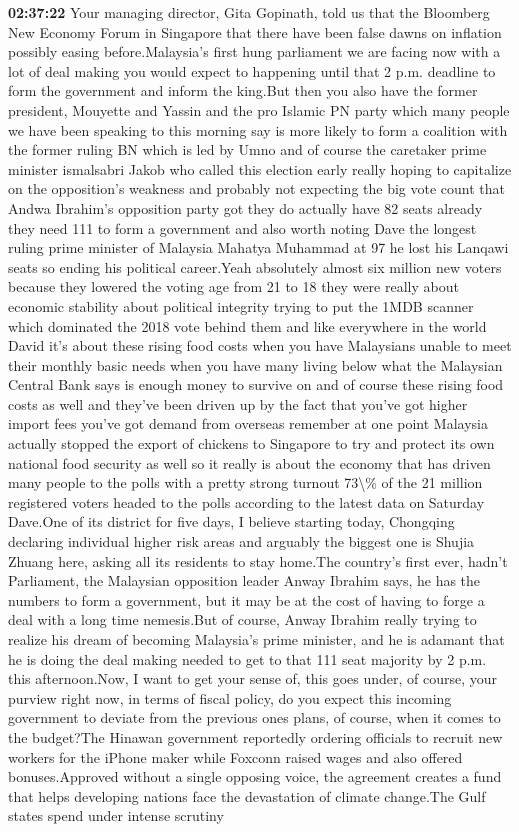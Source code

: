 \documentclass{article}%
\begin{document}
\textbf{02:37:22}%
\newline%
Your managing director, Gita Gopinath, told us that the Bloomberg New Economy Forum in Singapore that there have been false dawns on inflation possibly easing before.Malaysia's first hung parliament we are facing now with a lot of deal making you would expect to happening until that 2 p.m. deadline to form the government and inform the king.But then you also have the former president, Mouyette and Yassin and the pro Islamic PN party which many people we have been speaking to this morning say is more likely to form a coalition with the former ruling BN which is led by Umno and of course the caretaker prime minister ismalsabri Jakob who called this election early really hoping to capitalize on the opposition's weakness and probably not expecting the big vote count that Andwa Ibrahim's opposition party got they do actually have 82 seats already they need 111 to form a government and also worth noting Dave the longest ruling prime minister of Malaysia Mahatya Muhammad at 97 he lost his Lanqawi seats so ending his political career.Yeah absolutely almost six million new voters because they lowered the voting age from 21 to 18 they were really about economic stability about political integrity trying to put the 1MDB scanner which dominated the 2018 vote behind them and like everywhere in the world David it's about these rising food costs when you have Malaysians unable to meet their monthly basic needs when you have many living below what the Malaysian Central Bank says is enough money to survive on and of course these rising food costs as well and they've been driven up by the fact that you've got higher import fees you've got demand from overseas remember at one point Malaysia actually stopped the export of chickens to Singapore to try and protect its own national food security as well so it really is about the economy that has driven many people to the polls with a pretty strong turnout 73\textbackslash{}\% of the 21 million registered voters headed to the polls according to the latest data on Saturday Dave.One of its district for five days, I believe starting today, Chongqing declaring individual higher risk areas and arguably the biggest one is Shujia Zhuang here, asking all its residents to stay home.The country's first ever, hadn't Parliament, the Malaysian opposition leader Anway Ibrahim says, he has the numbers to form a government, but it may be at the cost of having to forge a deal with a long time nemesis.But of course, Anway Ibrahim really trying to realize his dream of becoming Malaysia's prime minister, and he is adamant that he is doing the deal making needed to get to that 111 seat majority by 2 p.m. this afternoon.Now, I want to get your sense of, this goes under, of course, your purview right now, in terms of fiscal policy, do you expect this incoming government to deviate from the previous ones plans, of course, when it comes to the budget?The Hinawan government reportedly ordering officials to recruit new workers for the iPhone maker while Foxconn raised wages and also offered bonuses.Approved without a single opposing voice, the agreement creates a fund that helps developing nations face the devastation of climate change.The Gulf states spend under intense scrutiny 
\end{document}
